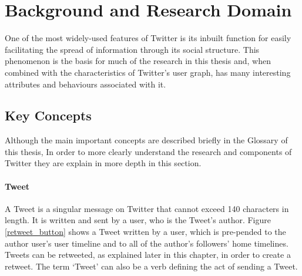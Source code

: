 \chapter{Background and Research Domain}


One of the most widely-used features of Twitter is its inbuilt function for easily facilitating the spread of information through its social structure. This phenomenon is the basis for much of the research in this thesis and, when combined with the characteristics of Twitter's user graph, has many interesting attributes and behaviours associated with it.

\section{Key Concepts}
Although the main important concepts are described briefly in the Glossary of this thesis, In order to more clearly understand the research and components of Twitter they are explain in more depth in this section.

\subsubsection{Tweet}
A Tweet is a singular message on Twitter that cannot exceed 140 characters in length. It is written and sent by a user, who is the Tweet's author. Figure \ref{retweet_button} shows a Tweet written by a user, which is pre-pended to the author user's user timeline and to all of the author's followers' home timelines. Tweets can be retweeted, as explained later in this chapter, in order to create a retweet. The term `Tweet' can also be a verb defining the act of sending a Tweet.

